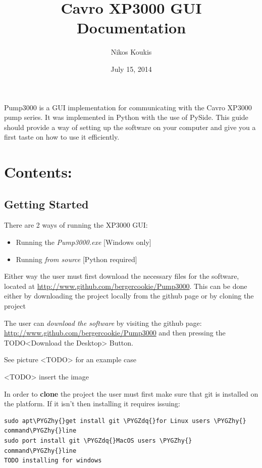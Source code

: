 \documentclass[letterpaper,10pt,english]{sphinxmanual}
\title{Cavro XP3000 GUI Documentation}
\date{July 15, 2014}
\author{Nikos Koukis}
\def\PYGZhy{\char`\-}
\def\PYGZdq{\char`\"}
\begin{document}
\maketitle
\tableofcontents
{}\label{index::doc}


Pump3000 is a GUI implementation for communicating with the Cavro XP3000 pump series.
It was implemented in Python with the use of PySide.
This guide should provide a way of setting up the software on your computer and
give you a first taste on how to use it efficiently.


\chapter{Contents:}
\label{index:guide-to-pump3000}\label{index:contents}

\section{Getting Started}
\label{getting-started:getting-started}\label{getting-started::doc}
There are 2 ways of running the XP3000 GUI:
\begin{itemize}
\item {} 
Running the \emph{Pump3000.exe} {[}Windows only{]}

\item {} 
Running \emph{from source} {[}Python required{]}

\end{itemize}

Either way the user must first download the necessary files for the software,
located at \href{http://www.github.com/bergercookie/Pump3000}{http://www.github.com/bergercookie/Pump3000}. This can be
done either by downloading the project locally from the github page or by cloning the project

The user can \emph{download the software} by visiting the github page:
\href{http://www.github.com/bergercookie/Pump3000}{http://www.github.com/bergercookie/Pump3000} and then pressing
the TODO\textless{}Download the Desktop\textgreater{} Button.

See picture \textless{}TODO\textgreater{} for an example case

\textless{}TODO\textgreater{} insert the image

In order to \textbf{clone} the project the user must first make sure that git is installed
on the platform. If it isn't then installing it requires issuing:

\begin{Verbatim}[commandchars=\\\{\}]
sudo apt\PYGZhy{}get install git \PYGZdq{}for Linux users \PYGZhy{} command\PYGZhy{}line
sudo port install git \PYGZdq{}MacOS users \PYGZhy{} command\PYGZhy{}line
TODO installing for windows
\end{Verbatim}
\end{document}
